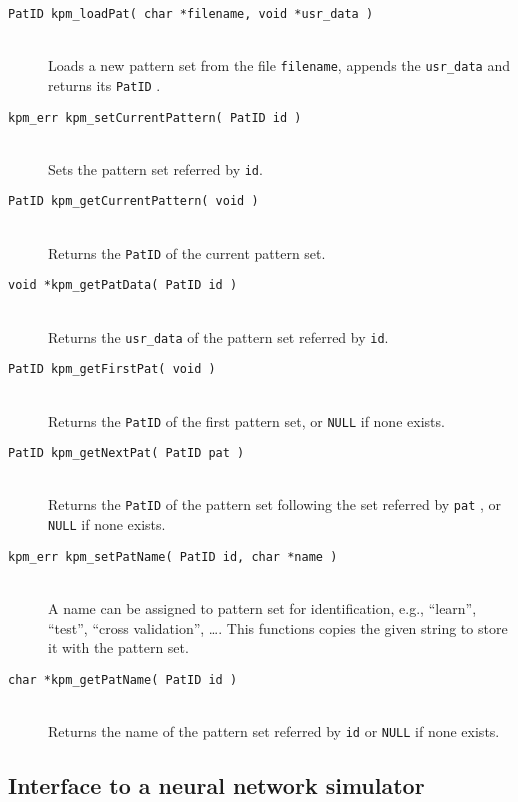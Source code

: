 \begin{description}
  \item[\tt PatID kpm\_loadPat( char *filename, void *usr\_data )]~\\
	Loads a new pattern set from the file \verb+filename+, appends the
	\verb+usr_data+ and returns its \verb+PatID+ .

  \item[\tt kpm\_err  kpm\_setCurrentPattern( PatID id )]~\\
	Sets the pattern set referred by \verb+id+.


  \item[\tt PatID kpm\_getCurrentPattern( void )]~\\
	Returns the  \verb+PatID+ of the current pattern set.

  \item[\tt void *kpm\_getPatData( PatID id )]~\\
	Returns the \verb+usr_data+ of the  pattern set referred by \verb+id+.

  \item[\tt PatID kpm\_getFirstPat( void )]~\\
	Returns the \verb+PatID+  of the first pattern set, or \verb+NULL+
	if none exists.


  \item[\tt PatID kpm\_getNextPat( PatID pat )]~\\
	Returns the \verb+PatID+  of the pattern set following the set referred by
	\verb+pat+ , or \verb+NULL+ if none exists.

  \item[\tt kpm\_err kpm\_setPatName( PatID id, char *name )]~\\
	A name can be assigned to pattern set for identification, e.g.,
    	"`learn"', "`test"', "`cross validation"', \dots .
	This functions copies the given string to store it with the pattern set.


  \item[\tt char *kpm\_getPatName( PatID id )]~\\
	Returns the name of the pattern set referred by \verb+id+ or \verb+NULL+
	if none exists.

\end{description}

\subsection{Interface to a neural network simulator} %


